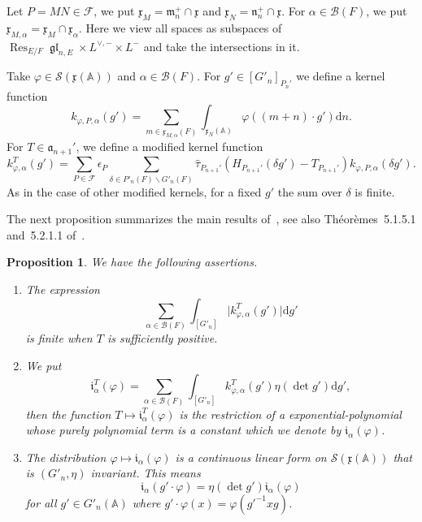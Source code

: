 \documentclass[letterpaper,11pt]{amsart}
\newcommand{\fa}{\mathfrak{a}}
\newcommand{\fm}{\mathfrak{m}}
\newcommand{\fn}{\mathfrak{n}}
\newcommand{\fx}{\mathfrak{x}}
\newcommand{\bA}{\mathbb{A}}
\newcommand{\cB}{\mathcal{B}}
\newcommand{\cF}{\mathcal{F}}
\newcommand{\cS}{\mathcal{S}}
\newcommand{\rd}{\mathrm{d}}
\newcommand{\bs}{\backslash}
\newcommand{\<}{\negthickspace}
\DeclareMathOperator{\gl}{\mathfrak{gl}}
\DeclareMathOperator{\Res}{Res}
\theoremstyle{definition}
\theoremstyle{plain}
\newtheorem{prop}[definition]{Proposition}
\theoremstyle{remark}
\numberwithin{equation}{section}
\begin{document}
Let $P = MN \in \cF$, we put $\fx_M = \fm_n^+ \cap \fx$ and $\fx_N = \fn_n^+ \cap \fx$. For $\alpha \in \cB(F)$, we put $\fx_{M,\alpha} = \fx_M \cap \fx_\alpha$. Here we view all spaces as subspaces of $\Res_{E/F} \gl_{n, E} \times L^{\vee, -} \times L^-$ and take the intersections in it.

Take $\varphi \in \cS(\fx(\bA))$ and $\alpha \in \cB(F)$. For $g' \in
[G'_n]_{P_{n}'}$ we define a kernel function
    \[
    k_{\varphi, P, \alpha}(g') = \sum_{m \in \fx_{M,\alpha}(F)}
    \int_{\fx_N(\bA)} \varphi((m+n) \cdot g') \rd n.
    \]
For $T \in \fa_{n+1}'$, we define a modified kernel function
    \[
    k_{\varphi, \alpha}^T(g') = \sum_{P \in \cF} \epsilon_P
    \sum_{\delta \in P'_n(F) \bs G'_n(F)}
    \widehat{\tau}_{P_{n+1}'}(H_{P_{n+1}'}(\delta g') - T_{P_{n+1}'})
    k_{\varphi, P, \alpha}(\delta g').
    \]
As in the case of other modified kernels, for a fixed $g'$ the sum over $\delta$ is finite.

The next proposition summarizes the main results of~\cite{Zydor2}, see also
Th\'{e}or\`{e}mes~5.1.5.1 and~5.2.1.1 of~\cite{CZ}.

\begin{prop}    \label{prop:infinitesimal_GL}
We have the following assertions.
\begin{enumerate}
\item The expression
    \[
    \sum_{\alpha \in \cB(F)} \int_{[G'_n]}
   \lvert  k_{\varphi, \alpha}^T(g') \rvert \rd g'
    \]
    is finite when $T$ is sufficiently positive. 

\item We put
    \[
    \mathfrak{i}_{\alpha}^T(\varphi) =
    \sum_{\alpha \in \cB(F)} \int_{[G'_n]}
    k_{\varphi, \alpha}^T(g') \eta(\det g') \rd g',
    \]
 then the function $T \mapsto \mathfrak{i}_{\alpha}^T(\varphi)$
    is the restriction of a exponential-polynomial whose purely polynomial
    term is a constant which we denote by $\mathfrak{i}_{\alpha}(\varphi)$.

\item The distribution $\varphi \mapsto \mathfrak{i}_{\alpha}(\varphi)$ is
    a continuous linear form on $\cS(\fx(\bA))$ that is $(G'_n, \eta)$
    invariant. This means
        \[
        \mathfrak{i}_{\alpha}(g' \cdot \varphi) = \eta(\det g')
        \mathfrak{i}_{\alpha}(\varphi)
        \]
    for all $g' \in G'_n(\bA)$ where $g' \cdot \varphi(x) =
    \varphi(g'^{-1} x g)$.
\end{enumerate}
\end{prop}
\end{document}
